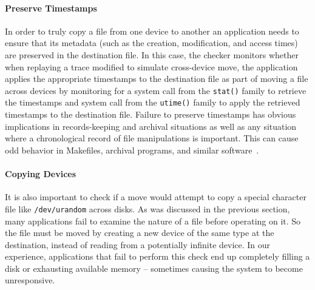 \paragraph{Preserve Timestamps}

In order to truly copy a file from one device
to another an application needs to ensure that its metadata (such as the
creation, modification, and access times) are preserved in the destination
file.
In this case, the checker monitors
whether when replaying a trace modified to simulate cross-device move,
the application applies
the appropriate timestamps to the destination file as part of moving a file
across devices by monitoring for a system call from the {\tt stat()} family to
retrieve the timestamps and system call from the {\tt utime()} family to apply
the retrieved timestamps to the destination file.
Failure to preserve timestamps has obvious
implications in records-keeping and archival situations as well as any situation
where a chronological record of file manipulations is important.  This can
cause odd behavior in Makefiles, archival programs, and similar
software~\cite{NautilusTimestamps, SudoTimestamp}.

\paragraph{Copying Devices}

It is also important to check if a move would attempt to copy a special
character file like {\tt /dev/urandom} across disks.  As was discussed in the
previous section, many applications fail to examine the nature of a file before
operating on it.  So the file must be moved by creating a new device of the same
type at the destination, instead of reading from a potentially infinite device.
In our experience, applications that fail to perform this check end up
completely filling a disk or exhausting available memory -- sometimes causing the
system to become unresponsive.


